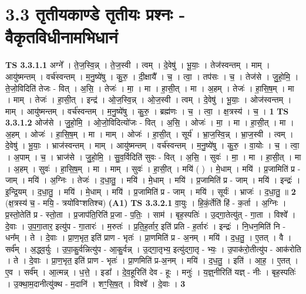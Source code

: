 \documentclass[17pt]{extarticle}
\begin{document}
\section*{ 3.3     तृतीयकाण्डे तृतीयः प्रश्नः - वैकृतविधीनामभिधानं }
                                \textbf{ TS 3.3.1.1} \newline
                  अग्ने᳚ । ते॒ज॒स्वि॒न्न् । ते॒ज॒स्वी । त्वम् । दे॒वेषु॑ । भू॒याः॒ । तेज॑स्वन्तम् । माम् । आयु॑ष्मन्तम् । वर्च॑स्वन्तम् । म॒नु॒ष्ये॑षु । कु॒रु॒ । दी॒क्षायै᳚ । च॒ । त्वा॒ । तप॑सः । च॒ । तेज॑से । जु॒हो॒मि॒ । ते॒जो॒विदिति॑ तेजः - वित् । अ॒सि॒ । तेजः॑ । मा॒ । मा । हा॒सी॒त् । मा । अ॒हम् । तेजः॑ । हा॒सि॒ष॒म् । मा । माम् । तेजः॑ । हा॒सी॒त् । इन्द्र॑ । ओ॒ज॒स्वि॒न्न् । ओ॒ज॒स्वी । त्वम् । दे॒वेषु॑ । भू॒याः॒ । ओज॑स्वन्तम् । माम् । आयु॑ष्मन्तम् । वर्च॑स्वन्तम् । म॒नु॒ष्ये॑षु । कु॒रु॒ । ब्रह्म॑णः । च॒ । त्वा॒ । क्ष॒त्रस्य॑ । च॒ । \textbf{  1} \newline
                  \newline
                                \textbf{ TS 3.3.1.2} \newline
                  ओज॑से । जु॒हो॒मि॒ । ओ॒जो॒विदित्यो॑जः - वित् । अ॒सि॒ । ओजः॑ । मा॒ । मा । हा॒सी॒त् । मा । अ॒हम् । ओजः॑ । हा॒सि॒ष॒म् । मा । माम् । ओजः॑ । हा॒सी॒त् । सूर्य॑ । भ्रा॒ज॒स्वि॒न्न् । भ्रा॒ज॒स्वी । त्वम् । दे॒वेषु॑ । भू॒याः॒ । भ्राज॑स्वन्तम् । माम् । आयु॑ष्मन्तम् । वर्च॑स्वन्तम् । म॒नु॒ष्ये॑षु । कु॒रु॒ । वा॒योः । च॒ । त्वा॒ । अ॒पाम् । च॒ । भ्राज॑से । जु॒हो॒मि॒ । सु॒व॒र्विदिति॑ सुवः - वित् । अ॒सि॒ । सुवः॑ । मा॒ । मा । हा॒सी॒त् । मा । अ॒हम् । सुवः॑ । हा॒सि॒ष॒म् । मा । माम् । सुवः॑ । हा॒सी॒त् । मयि॑ ( ) । मे॒धाम् । मयि॑ । प्र॒जामिति॑ प्र - जाम् । मयि॑ । अ॒ग्निः । तेजः॑ । द॒धा॒तु॒ । मयि॑ । मे॒धाम् । मयि॑ । प्र॒जामिति॑ प्र - जाम् । मयि॑ । इन्द्रः॑ । इ॒न्द्रि॒यम् । द॒धा॒तु॒ । मयि॑ । मे॒धाम् । मयि॑ । प्र॒जामिति॑ प्र - जाम् । मयि॑ । सूर्यः॑ । भ्राजः॑ । द॒धा॒तु॒ ॥ \textbf{  2} \newline
                  \newline
                      (क्ष॒त्रस्य॑ च॒ - मयि॒ - त्रयो॑विꣳशतिश्च)  \textbf{(A1)} \newline \newline
                                \textbf{ TS 3.3.2.1} \newline
                  वा॒युः । हि॒कं॒र्तेति॑ हिं - क॒र्ता । अ॒ग्निः । प्र॒स्तो॒तेति॑ प्र - स्तो॒ता । प्र॒जाप॑ति॒रिति॑ प्र॒जा - प॒तिः॒ । साम॑ । बृह॒स्पतिः॑ । उ॒द्गा॒तेत्यु॑त् - गा॒ता । विश्वे᳚ । दे॒वाः । उ॒प॒गा॒तार॒ इत्यु॑प - गा॒तारः॑ । म॒रुतः॑ । प्र॒ति॒ह॒र्तार॒ इति॑ प्रति - ह॒र्तारः॑ । इन्द्रः॑ । नि॒धन॒मिति॑ नि - धन᳚म् । ते । दे॒वाः । प्रा॒ण॒भृत॒ इति॑ प्राण - भृतः॑ । प्रा॒णमिति॑ प्र - अ॒नम् । मयि॑ । द॒ध॒तु॒ । ए॒तत् । वै । सर्व᳚म् । अ॒द्ध्व॒र्युः । उ॒पा॒कु॒र्वन्नित्यु॑प - आ॒कु॒र्वन्न् । उ॒द्गा॒तृभ्य॒ इत्यु॑द्गा॒तृ - भ्यः॒ । उ॒पाक॑रो॒तीत्यु॑प - आक॑रोति । ते । दे॒वाः । प्रा॒ण॒भृत॒ इति॑ प्राण - भृतः॑ । प्रा॒णमिति॑ प्र-अ॒नम् । मयि॑ । द॒ध॒तु॒ । इति॑ । आ॒ह॒ । ए॒तत् । ए॒व । सर्व᳚म् । आ॒त्मन्न् । ध॒त्ते॒ । इडा᳚ । दे॒व॒हूरिति॑ देव - हूः । मनुः॑ । य॒ज्ञ्॒नीरिति॑ यज्ञ् - नीः । बृह॒स्पतिः॑ । उ॒क्था॒म॒दानीत्यु॑क्थ - म॒दानि॑ । शꣳ॒॒सि॒ष॒त् । विश्वे᳚ । दे॒वाः । \textbf{  3} \newline
\end{document}
